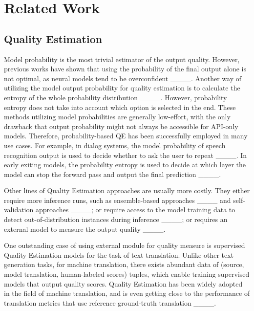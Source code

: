 \section{Related Work}
\subsection{Quality Estimation} 
Model probability is the most trivial estimator of the output quality. However, previous works have shown that using the probability of the final output alone is not optimal, as neural models tend to be overconfident ____. Another way of utilizing the model output probability for quality estimation is to calculate the entropy of the whole probability distribution ____. However, probability entropy does not take into account which option is selected in the end. These methods utilizing model probabilities are generally low-effort, with the only drawback that output probability might not always be accessible for API-only models. Therefore, probability-based QE has been successfully employed in many use cases. For example, in dialog systems, the model probability of speech recognition output is used to decide whether to ask the user to repeat ____. In early exiting models, the probability entropy is used to decide at which layer the model can stop the forward pass and output the final prediction ____.

Other lines of Quality Estimation approaches are usually more costly. They either require more inference runs, such as ensemble-based approaches ____ and self-validation approaches ____; or require access to the model training data to detect out-of-distribution instances during inference ____; or requires an external model to measure the output quality ____.

One outstanding case of using external module for quality measure is supervised Quality Estimation models for the task of text translation. Unlike other text generation tasks, for machine translation, there exists abundant data of (source, model translation, human-labeled scores) tuples, which enable training supervised models that output quality scores. Quality Estimation has been widely adopted in the field of machine translation, and is even getting close to the performance of translation metrics that use reference ground-truth translation ____.

